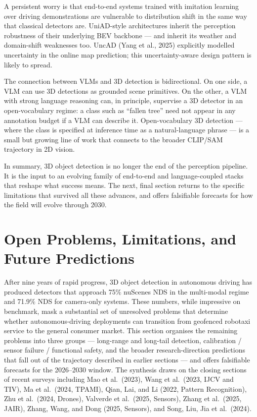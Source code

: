 \documentclass{article}
\begin{document}
A persistent worry is that end-to-end systems trained with imitation learning over driving demonstrations are vulnerable to distribution shift in the same way that classical detectors are. UniAD-style architectures inherit the perception robustness of their underlying BEV backbone --- and inherit its weather and domain-shift weaknesses too. UncAD (Yang et al., 2025) explicitly modelled uncertainty in the online map prediction; this uncertainty-aware design pattern is likely to spread.

The connection between VLMs and 3D detection is bidirectional. On one side, a VLM can use 3D detections as grounded scene primitives. On the other, a VLM with strong language reasoning can, in principle, supervise a 3D detector in an open-vocabulary regime: a class such as ``fallen tree'' need not appear in any annotation budget if a VLM can describe it. Open-vocabulary 3D detection --- where the class is specified at inference time as a natural-language phrase --- is a small but growing line of work that connects to the broader CLIP/SAM trajectory in 2D vision.

In summary, 3D object detection is no longer the end of the perception pipeline. It is the input to an evolving family of end-to-end and language-coupled stacks that reshape what success means. The next, final section returns to the specific limitations that survived all these advances, and offers falsifiable forecasts for how the field will evolve through 2030.
\section{Open Problems, Limitations, and Future Predictions}\label{sec:open-problems-limitations-and-future-predictions}
After nine years of rapid progress, 3D object detection in autonomous driving has produced detectors that approach 75\% nuScenes NDS in the multi-modal regime and 71.9\% NDS for camera-only systems. These numbers, while impressive on benchmark, mask a substantial set of unresolved problems that determine whether autonomous-driving deployments can transition from geofenced robotaxi service to the general consumer market. This section organises the remaining problems into three groups --- long-range and long-tail detection, calibration / sensor failure / functional safety, and the broader research-direction predictions that fall out of the trajectory described in earlier sections --- and offers falsifiable forecasts for the 2026--2030 window. The synthesis draws on the closing sections of recent surveys including Mao et al.~(2023), Wang et al.~(2023, IJCV and TIV), Ma et al.~(2024, TPAMI), Qian, Lai, and Li (2022, Pattern Recognition), Zhu et al.~(2024, Drones), Valverde et al.~(2025, Sensors), Zhang et al.~(2025, JAIR), Zhang, Wang, and Dong (2025, Sensors), and Song, Liu, Jia et al.~(2024).
\end{document}
